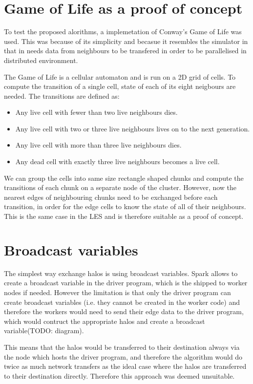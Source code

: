\documentclass{l4proj}
\begin{document}
\section{Game of Life as a proof of concept}
To test the proposed alorithms, a implemetation of Conway's Game of Life was used.
This was because of its simplicity and becasue it resembles the simulator in that
in needs data from neighbours to be transfered in order to be parallelised in 
distributed environment.

The Game of Life is a cellular automaton and is run on a 2D grid of cells. To compute
the transition of a single cell, state of each of its eight neigbours are needed.
The transitions are defined as:

\begin{itemize} 
\item Any live cell with fewer than two live neighbours dies.
\item Any live cell with two or three live neighbours lives on to the next generation.
\item Any live cell with more than three live neighbours dies.
\item Any dead cell with exactly three live neighbours becomes a live cell.
\end{itemize}

We can group the cells into same size rectangle shaped chunks and compute the transitions of each
chunk on a separate node of the cluster. However, now the nearest edges of neighbouring
chunks need to be exchanged before each transition, in order for the edge cells to know
the state of all of their neighbours. This is the same case in the LES and is therefore
suitable as a proof of concept.

\section{Broadcast variables}

The simplest way exchange halos is using broadcast variables. Spark allows to
create a broadcast variable in the driver program, which is the shipped to worker
nodes if needed. However the limitation is that only the driver program can create
broadcast variables (i.e. they cannot be created in the worker code) and therefore
the workers would need to send their edge data to the driver program, which would
contruct the appropriate halos and create a broadcast variable(TODO: diagram).

This means that the halos would be transferred to their destination always via
the node which hosts the driver program, and therefore the algorithm would do 
twice as much network transfers as the ideal case where the halos are transferred
to their destination directly. Therefore this approach was deemed unsuitable. 
\end{document}

